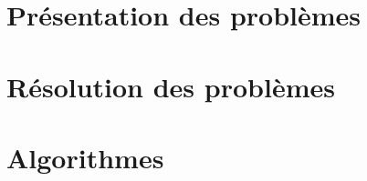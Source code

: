 \documentclass[a4paper,9pt]{report}
\newcommand{\incdir}{inc/}
\begin{document}
%

\chapter{Pr\'{e}sentation des problèmes}



\chapter{Résolution des problèmes}

%

\newpage
\appendix
\appendixpageoff

\chapter{Algorithmes}


\end{document}
